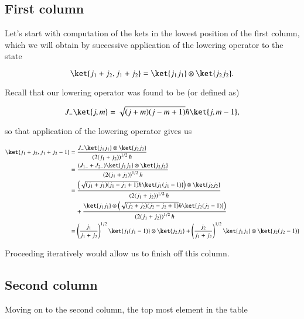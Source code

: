 \subsection{First column}

Let's start with computation of the kets in the lowest position of the first column, which we will obtain by successive application of the lowering operator to the state

\begin{equation}\label{eqn:qmTwoL18:30}
\ket{j_1 + j_2, j_1 + j_2} = \ket{j_1 j_1} \otimes \ket{j_2 j_2}.
\end{equation}

Recall that our lowering operator was found to be (or defined as) 

\begin{equation}\label{eqn:qmTwoL18:570}
J_{-} \ket{j, m} = \sqrt{(j+m)(j-m+1)} \hbar \ket{j, m-1},
\end{equation}

so that application of the lowering operator gives us

\begin{align*}
\ket{j_1 + j_2, j_1 + j_2 -1} 
&= 
\frac{J_{-} \ket{j_1 j_1} \otimes \ket{j_2 j_2}}{
\left(2 (j_1+ j_2)\right)^{1/2} \hbar
} \\
&=
\frac{(J_{1-} + J_{2-}) \ket{j_1 j_1} \otimes \ket{j_2 j_2}}{
\left(2 (j_1+ j_2)\right)^{1/2} \hbar
} \\
&=
\frac{
\left( 
\sqrt{(j_1 + j_1)(j_1 - j_1 + 1)} \hbar 
\ket{j_1(j_1 - 1)} \right) \otimes \ket{j_2 j_2}
}
{
\left(2 (j_1+ j_2)\right)^{1/2} \hbar
} \\
&\quad+
\frac{
\ket{j_1 j_1} \otimes 
\left(
\sqrt{(j_2 + j_2)(j_2 - j_2 + 1)} \hbar 
\ket{j_2(j_2 -1)}
\right)
}
{
\left(2 (j_1+ j_2)\right)^{1/2} \hbar
} \\
&=
\left(\frac{j_1}{j_1 + j_2}\right)^{1/2}
\ket{j_1 (j_1-1)} \otimes \ket{j_2 j_2}
+
\left(\frac{j_2}{j_1 + j_2}\right)^{1/2}
\ket{j_1 j_1} \otimes \ket{j_2 (j_2-1)}
 \\
\end{align*}

Proceeding iteratively would allow us to finish off this column.

\subsection{Second column}

Moving on to the second column, the top most element in the table

